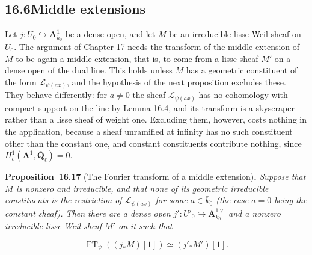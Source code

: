 \documentclass[11pt]{article}
\newenvironment{bpstatement}[2]{\par\addvspace{0.6\baselineskip}\noindent\textbf{#1}#2\textbf{.}\enspace\ignorespaces}
  {\par\addvspace{0.4\baselineskip}}
\newenvironment{bpstatementit}[2]{\begin{bpstatement}{#1}{#2}\itshape\ignorespaces}{\end{bpstatement}}
\begin{document}
\subsection*{\texorpdfstring{16.6\quad Middle extensions}{16.6 Middle extensions}}
\label{bp216}%
\label{bp217}%
Let \(j:U_0\hookrightarrow\mathbf A^1_{k_0}\) be a dense open, and let \(M\) be an irreducible lisse Weil sheaf on \(U_0\). The argument of Chapter \hyperref[bp223]{17} needs the transform of the middle extension of \(M\) to be again a middle extension, that is, to come from a lisse sheaf \(M'\) on a dense open of the dual line. This holds unless \(M\) has a geometric constituent of the form \(\mathcal L_{\psi(ax)}\), and the hypothesis of the next proposition excludes these. They behave differently: for \(a\ne0\) the sheaf \(\mathcal L_{\psi(ax)}\) has no cohomology with compact support on the line by Lemma \hyperref[bp179]{16.4}, and its transform is a skyscraper rather than a lisse sheaf of weight one. Excluding them, however, costs nothing in the application, because a sheaf unramified at infinity has no such constituent other than the constant one, and constant constituents contribute nothing, since \(H^1_c(\mathbf A^1,\overline{\mathbf Q}_\ell)=0\).

\label{bp218}%
\begin{bpstatementit}{Proposition~16.17}{ (The Fourier transform of a middle extension)}
Suppose that \(M\) is nonzero and irreducible, and that none of its geometric irreducible constituents is the restriction of \(\mathcal L_{\psi(ax)}\) for some \(a\in\bar k_0\) (the case \(a=0\) being the constant sheaf). Then there are a dense open \(j':U'_0\hookrightarrow\mathbf A^{1\vee}_{k_0}\) and a nonzero irreducible lisse Weil sheaf \(M'\) on it such that

\[
\operatorname{FT}_\psi((j_*M)[1])\simeq(j'_*M')[1].
\]
\end{bpstatementit}
\end{document}
